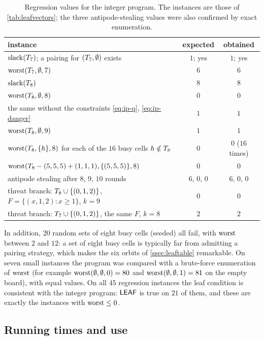 \begin{table}[ht]
\centering\small
\begin{tabular}{@{}lcc@{}}
\toprule
instance & expected & obtained\\
\midrule
$\operatorname{slack}(T_7)$; a pairing for $(T_7,\emptyset)$ exists & $1$; yes & $1$; yes\\
$\operatorname{worst}(T_7,\emptyset,7)$ & $6$ & $6$\\
$\operatorname{slack}(T_8)$ & $8$ & $8$\\
$\operatorname{worst}(T_8,\emptyset,8)$ & $0$ & $0$\\
the same without the constraints \eqref{eq:ip-q}, \eqref{eq:ip-danger} & $1$ & $1$\\
$\operatorname{worst}(T_8,\emptyset,9)$ & $1$ & $1$\\
$\operatorname{worst}(T_8,\{h\},8)$ for each of the $16$ busy cells $h\notin T_8$ & $0$ & $0$ ($16$ times)\\
$\operatorname{worst}(T_8-(5,5,5)+(1,1,1),\{(5,5,5)\},8)$ & $0$ & $0$\\
antipode stealing after $8$, $9$, $10$ rounds & $6$, $0$, $0$ & $6$, $0$, $0$\\
threat branch: $T_8\cup\{(0,1,2)\}$, $F=\{(x,1,2):x\ge1\}$, $k=9$ & $0$ & $0$\\
threat branch: $T_7\cup\{(0,1,2)\}$, the same $F$, $k=8$ & $2$ & $2$\\
\bottomrule
\end{tabular}
\caption{Regression values for the integer program. The instances are those of \cref{tab:leafvectors}; the
three antipode-stealing values were also confirmed by exact enumeration.}
\label{tab:ip-regression}
\end{table}

In addition, $20$ random sets of eight busy cells (seeded) all fail, with $\operatorname{worst}$ between $2$ and $12$:
a set of eight busy cells is typically far from admitting a pairing strategy, which makes the six orbits of
\cref{ssec:leaftable} remarkable. On seven small instances the program was compared with a brute-force
enumeration of $\operatorname{worst}$ (for example $\operatorname{worst}(\emptyset,\emptyset,0)=80$ and $\operatorname{worst}(\emptyset,\emptyset,1)=81$
on the empty board), with equal values. On all $45$ regression instances the leaf condition is consistent
with the integer program: $\mathsf{LEAF}$ is true on $21$ of them, and these are exactly the instances with
$\operatorname{worst}\le0$.

\subsection{Running times and use}\label{ssec:ip-times}

